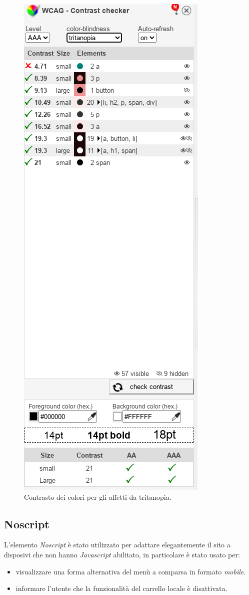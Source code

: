 \documentclass{template}
\begin{document}
	\begin{figure}[H]
		\centering
		\includegraphics[scale=0.6]{src/contrasti/tritanopia.png}
		\caption{Contrasto dei colori per gli affetti da tritanopia.}
	\end{figure}
    \pagebreak
	\subsection{Noscript}
    L'elemento \textit{Noscript} è stato utilizzato per adattare elegantemente il sito a disposivi che non hanno \textit{Javascript} abilitato, in particolare è stato usato per:
    \begin{itemize}
        \item visualizzare una forma alternativa del menù a comparsa in formato \textit{mobile}.
        \item informare l'utente che la funzionalità del carrello locale è disattivata.
    \end{itemize}
	
\end{document}
